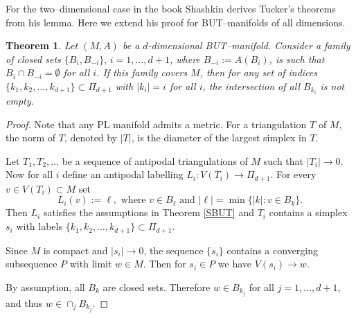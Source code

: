 \documentclass[a4paper,12pt]{article}
\newtheorem{theorem}{Theorem}[section]
\begin{document}
For the two--dimensional case  in the book \cite{Shashkin99}  Shashkin derives Tucker's theorems from his lemma. Here we extend his proof for BUT--manifolds of all dimensions.


\begin{theorem} \label{t41} Let $(M,A)$ be a $d$-dimensional BUT--manifold. Consider a family of closed sets $\{B_i, B_{-i}\},\, i=1,\ldots, d+1$, where $B_{-i}:=A(B_i)$, is such that $B_i\cap B_{-i}=\emptyset$ for all $i$.  If this family  covers $M$, then for any set of  indices $\{k_1,k_2,\ldots,k_{d+1}\}\subset\Pi_{d+1}$ with $|k_i|=i$ for all $i$, the intersection of all $B_{k_i}$  is not empty.
\end{theorem}
\begin{proof} Note that any PL manifold admits a metric. For a triangulation $T$ of $M$, the norm of $T$, denoted by $|T|$, is the diameter of the largest simplex in $T$.

Let $T_1,T_2,\ldots$ be a sequence of antipodal triangulations of $M$ such that $|T_i|\to0$.
Now for all $i$ define an antipodal labelling $L_i:V(T_i)\to \Pi_{d+1}$. For every  $v\in V(T_i)\subset M$ set
$$
L_i(v):=\ell, \mbox{ where } v\in B_\ell \mbox{ and } |\ell|=\min{\{|k|: v\in B_k\}}.
$$
Then $L_i$ satisfies the assumptions in Theorem \ref{SBUT} and $T_i$ contains a simplex $s_i$ with labels $\{k_1,k_2,\ldots,k_{d+1}\}\subset\Pi_{d+1}$.

 Since $M$ is compact and $|s_i|\to0$, the sequence $\{s_i\}$ contains a converging subsequence $P$  with limit $w\in M$. Then for $s_i\in P$ we have $V(s_i)\to w$.

By assumption, all $B_k$ are closed sets.  Therefore $w\in B_{k_j}$ for all $j=1,\ldots, d+1$, and thus $w\in \cap_j{B_{k_j}}$.
\end{proof}
\end{document}
